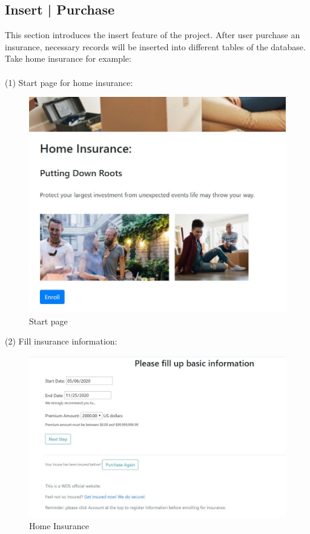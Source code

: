 \documentclass[12pt]{article}
\begin{document}
	
	\subsection{Insert | Purchase}
	\qquad This section introduces the insert feature of the project. After user purchase an insurance, necessary records will be inserted into different tables of the database. Take home insurance for example:\\\\
	(1) Start page for home insurance:
	\begin{figure}[H]
		\centering
		\includegraphics[scale=0.7]{hins}
		\caption{Start page}
	\end{figure}
	\newpage
	\noindent(2) Fill insurance information:
	\begin{figure}[H]
		\centering
		\includegraphics[scale=0.7]{homeinsurance}
		\caption{Home Insurance}
	\end{figure}
\end{document}
